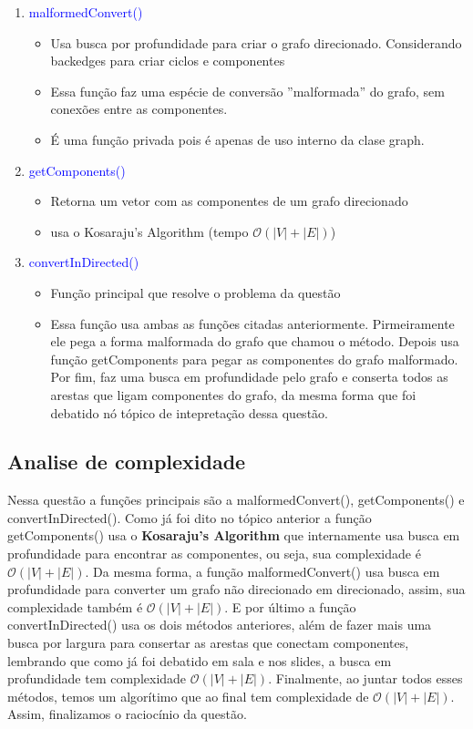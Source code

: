 \documentclass[12pt,a4paper, brazil]{article}
\newcommand{\B}[1]{\textbf{#1}}
\newcommand{\azul}[1]{\textcolor{blue}{#1}}
\begin{document}
\begin{enumerate}
	\item \azul{malformedConvert()} 
		\begin{itemize}
			\item Usa busca por profundidade para criar o grafo direcionado. Considerando backedges para criar ciclos e componentes
			\item Essa função faz uma espécie de conversão ''malformada'' do grafo, sem conexões entre as componentes.
			\item É uma função privada pois é apenas de uso interno da clase graph.
		\end{itemize}
	\item \azul{getComponents()} 
		\begin{itemize}
			\item Retorna um vetor com as componentes de um grafo direcionado
			\item usa o Kosaraju's Algorithm (tempo $\mathcal{O}(|V|+|E|)$)
		\end{itemize}
	\item \azul{convertInDirected()} 
		\begin{itemize}
			\item Função principal que resolve o problema da questão
			\item Essa função usa ambas as funções citadas anteriormente. Pirmeiramente ele pega a forma malformada do grafo que chamou o método. Depois usa função getComponents para pegar as componentes do grafo malformado. Por fim, faz uma busca em profundidade pelo grafo e  conserta todos as arestas que ligam componentes do grafo, da mesma forma que foi debatido nó tópico de intepretação dessa questão.
		\end{itemize}
	
\end{enumerate}

\subsection{Analise de complexidade}

Nessa questão a funções principais são a malformedConvert(), getComponents() e convertInDirected(). Como já foi dito no tópico anterior a função getComponents() usa o \B{Kosaraju's Algorithm} que internamente usa busca em profundidade para encontrar as componentes, ou seja, sua complexidade é $\mathcal{O}(|V|+|E|)$. Da mesma forma, a função malformedConvert() usa busca em profundidade para converter um grafo não direcionado em direcionado, assim, sua complexidade também é $\mathcal{O}(|V|+|E|)$. E por último a função convertInDirected() usa os dois métodos anteriores, além de fazer mais uma busca por largura para consertar as arestas que conectam componentes, lembrando que como já foi debatido em sala e nos slides, a busca em profundidade tem complexidade $\mathcal{O}(|V|+|E|)$. Finalmente, ao juntar todos esses métodos, temos um algorítimo que ao final tem complexidade de $\mathcal{O}(|V|+|E|)$. Assim, finalizamos o raciocínio da questão.
\end{document}

